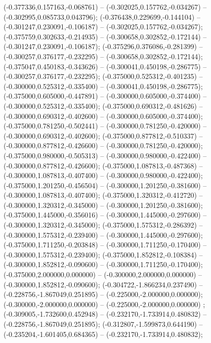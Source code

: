  (-0.377336,0.157163,-0.068761) -- (-0.302025,0.157762,-0.034267) -- (-0.302995,0.085733,0.043796);
 (-0.376438,0.229699,-0.144104) -- (-0.301247,0.230091,-0.106187) -- (-0.302025,0.157762,-0.034267);
 (-0.375759,0.302633,-0.214935) -- (-0.300658,0.302852,-0.172144) -- (-0.301247,0.230091,-0.106187);
 (-0.375296,0.376086,-0.281399) -- (-0.300257,0.376177,-0.232295) -- (-0.300658,0.302852,-0.172144);
 (-0.375047,0.450183,-0.343626) -- (-0.300041,0.450198,-0.286775) -- (-0.300257,0.376177,-0.232295);
 (-0.375000,0.525312,-0.401235) -- (-0.300000,0.525312,-0.335400) -- (-0.300041,0.450198,-0.286775);
 (-0.375000,0.605000,-0.447891) -- (-0.300000,0.605000,-0.374400) -- (-0.300000,0.525312,-0.335400);
 (-0.375000,0.690312,-0.481626) -- (-0.300000,0.690312,-0.402600) -- (-0.300000,0.605000,-0.374400);
 (-0.375000,0.781250,-0.502441) -- (-0.300000,0.781250,-0.420000) -- (-0.300000,0.690312,-0.402600);
 (-0.375000,0.877812,-0.510337) -- (-0.300000,0.877812,-0.426600) -- (-0.300000,0.781250,-0.420000);
 (-0.375000,0.980000,-0.505313) -- (-0.300000,0.980000,-0.422400) -- (-0.300000,0.877812,-0.426600);
 (-0.375000,1.087813,-0.487368) -- (-0.300000,1.087813,-0.407400) -- (-0.300000,0.980000,-0.422400);
 (-0.375000,1.201250,-0.456504) -- (-0.300000,1.201250,-0.381600) -- (-0.300000,1.087813,-0.407400);
 (-0.375000,1.320312,-0.412720) -- (-0.300000,1.320312,-0.345000) -- (-0.300000,1.201250,-0.381600);
 (-0.375000,1.445000,-0.356016) -- (-0.300000,1.445000,-0.297600) -- (-0.300000,1.320312,-0.345000);
 (-0.375000,1.575312,-0.286392) -- (-0.300000,1.575312,-0.239400) -- (-0.300000,1.445000,-0.297600);
 (-0.375000,1.711250,-0.203848) -- (-0.300000,1.711250,-0.170400) -- (-0.300000,1.575312,-0.239400);
 (-0.375000,1.852812,-0.108384) -- (-0.300000,1.852812,-0.090600) -- (-0.300000,1.711250,-0.170400);
 (-0.375000,2.000000,0.000000) -- (-0.300000,2.000000,0.000000) -- (-0.300000,1.852812,-0.090600);
 (-0.304722,-1.866234,0.237490) -- (-0.228756,-1.867049,0.251895) -- (-0.225000,-2.000000,0.000000);
 (-0.300000,-2.000000,0.000000) -- (-0.225000,-2.000000,0.000000) ;
 (-0.309005,-1.732600,0.452948) -- (-0.232170,-1.733914,0.480832) -- (-0.228756,-1.867049,0.251895);
 (-0.312807,-1.599873,0.644190) -- (-0.235204,-1.601405,0.684365) -- (-0.232170,-1.733914,0.480832);
